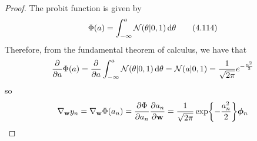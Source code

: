 \vspace{1em}

\begin{proof}
    The probit function is given by 
    \begin{equation*}
        \Phi(a) = \int_{-\infty}^{a} \mathcal{N}(\theta | 0, 1) \mathop{}\!\mathrm{d} \theta
        \tag{4.114}\label{eq:4.114}
    \end{equation*}
    Therefore, from the fundamental theorem of calculus, we have that
    \[
        \pdv{a} \Phi(a) 
        = \pdv{a} \int_{-\infty}^a \mathcal{N}(\theta | 0, 1) \mathop{}\!\mathrm{d} \theta
        = \mathcal{N}(a | 0, 1) = \frac{1}{\sqrt{2\pi}} e^{-\frac{a^2}{2}}
    \] 
    so
    \[
        \nabla_\mathbf{w} y_n 
        = \nabla_\mathbf{w} \Phi(a_n)
        = \pdv{\Phi}{a_n} \pdv{a_n}{\mathbf{w}} 
        = \frac{1}{\sqrt{2\pi}} \exp{-\frac{a_n^2}{2}}\bm{\phi}_n
    \]


\end{proof}
